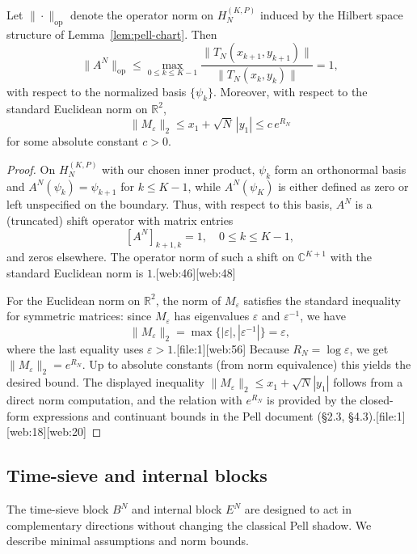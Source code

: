 \documentclass[11pt]{article}
\begin{document}
\begin{lemma}
\label{lem:A-norm}
Let \(\|\cdot\|_{\text{op}}\) denote the operator norm on \(H_N^{(K,P)}\)
induced by the Hilbert space structure of Lemma~\ref{lem:pell-chart}.
Then
\[
\|A^N\|_{\text{op}} \le \max_{0\le k\le K-1}
\frac{\|T_N(x_{k+1},y_{k+1})\|}{\|T_N(x_k,y_k)\|}
= 1,
\]
with respect to the normalized basis \(\{\psi_k\}\).
Moreover, with respect to the standard Euclidean norm on \(\mathbb{R}^2\),
\[
\|M_\varepsilon\|_{2} \le x_1 + \sqrt{N}\,|y_1|
\le c\,e^{R_N}
\]
for some absolute constant \(c>0\).
\end{lemma}

\begin{proof}
On \(H_N^{(K,P)}\) with our chosen inner product, \(\psi_k\) form an
orthonormal basis and \(A^N(\psi_k) = \psi_{k+1}\) for \(k\le K-1\),
while \(A^N(\psi_K)\) is either defined as zero or left unspecified on
the boundary. Thus, with respect to this basis, \(A^N\) is a (truncated)
shift operator with matrix entries
\[
[A^N]_{k+1,k} = 1,\quad 0\le k\le K-1,
\]
and zeros elsewhere. The operator norm of such a shift on
\(\mathbb{C}^{K+1}\) with the standard Euclidean norm is \(1\).[web:46][web:48]

For the Euclidean norm on \(\mathbb{R}^2\), the norm of
\(M_\varepsilon\) satisfies the standard inequality for symmetric
matrices: since \(M_\varepsilon\) has eigenvalues \(\varepsilon\) and
\(\varepsilon^{-1}\), we have
\[
\|M_\varepsilon\|_2 = \max\{|\varepsilon|,|\varepsilon^{-1}|\} = \varepsilon,
\]
where the last equality uses \(\varepsilon>1\).[file:1][web:56]
Because \(R_N=\log\varepsilon\), we get \(\|M_\varepsilon\|_2=e^{R_N}\).
Up to absolute constants (from norm equivalence) this yields the desired
bound. The displayed inequality
\(\|M_\varepsilon\|_2 \le x_1 + \sqrt{N}|y_1|\) follows from a direct
norm computation, and the relation with \(e^{R_N}\) is provided by the
closed-form expressions and continuant bounds in the Pell document
(§2.3, §4.3).[file:1][web:18][web:20]
\end{proof}

\subsection{Time-sieve and internal blocks}
\label{app:BE-bounds}

The time-sieve block \(B^N\) and internal block \(E^N\) are designed to
act in complementary directions without changing the classical Pell
shadow. We describe minimal assumptions and norm bounds.
\end{document}
